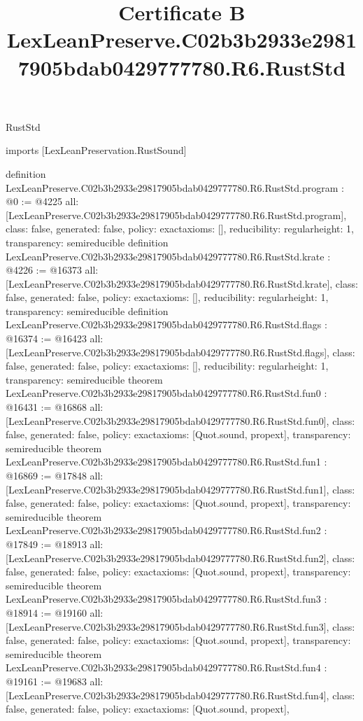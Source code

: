 \begin{lexlean}{RustStd}
\title{Certificate B LexLeanPreserve.C02b3b2933e29817905bdab0429777780.R6.RustStd}
\begin{coremodule}
imports [LexLeanPreservation.RustSound]

definition LexLeanPreserve.C02b3b2933e29817905bdab0429777780.R6.RustStd.program : @0 := @4225 {
  all: [LexLeanPreserve.C02b3b2933e29817905bdab0429777780.R6.RustStd.program],
  class: false,
  generated: false,
  policy: exact{axioms: []},
  reducibility: regular{height: 1},
  transparency: semireducible
}
definition LexLeanPreserve.C02b3b2933e29817905bdab0429777780.R6.RustStd.krate : @4226 := @16373 {
  all: [LexLeanPreserve.C02b3b2933e29817905bdab0429777780.R6.RustStd.krate],
  class: false,
  generated: false,
  policy: exact{axioms: []},
  reducibility: regular{height: 1},
  transparency: semireducible
}
definition LexLeanPreserve.C02b3b2933e29817905bdab0429777780.R6.RustStd.flags : @16374 := @16423 {
  all: [LexLeanPreserve.C02b3b2933e29817905bdab0429777780.R6.RustStd.flags],
  class: false,
  generated: false,
  policy: exact{axioms: []},
  reducibility: regular{height: 1},
  transparency: semireducible
}
theorem LexLeanPreserve.C02b3b2933e29817905bdab0429777780.R6.RustStd.fun0 : @16431 := @16868 {
  all: [LexLeanPreserve.C02b3b2933e29817905bdab0429777780.R6.RustStd.fun0],
  class: false,
  generated: false,
  policy: exact{axioms: [Quot.sound, propext]},
  transparency: semireducible
}
theorem LexLeanPreserve.C02b3b2933e29817905bdab0429777780.R6.RustStd.fun1 : @16869 := @17848 {
  all: [LexLeanPreserve.C02b3b2933e29817905bdab0429777780.R6.RustStd.fun1],
  class: false,
  generated: false,
  policy: exact{axioms: [Quot.sound, propext]},
  transparency: semireducible
}
theorem LexLeanPreserve.C02b3b2933e29817905bdab0429777780.R6.RustStd.fun2 : @17849 := @18913 {
  all: [LexLeanPreserve.C02b3b2933e29817905bdab0429777780.R6.RustStd.fun2],
  class: false,
  generated: false,
  policy: exact{axioms: [Quot.sound, propext]},
  transparency: semireducible
}
theorem LexLeanPreserve.C02b3b2933e29817905bdab0429777780.R6.RustStd.fun3 : @18914 := @19160 {
  all: [LexLeanPreserve.C02b3b2933e29817905bdab0429777780.R6.RustStd.fun3],
  class: false,
  generated: false,
  policy: exact{axioms: [Quot.sound, propext]},
  transparency: semireducible
}
theorem LexLeanPreserve.C02b3b2933e29817905bdab0429777780.R6.RustStd.fun4 : @19161 := @19683 {
  all: [LexLeanPreserve.C02b3b2933e29817905bdab0429777780.R6.RustStd.fun4],
  class: false,
  generated: false,
  policy: exact{axioms: [Quot.sound, propext]},
}
\end{coremodule}
\end{lexlean}
